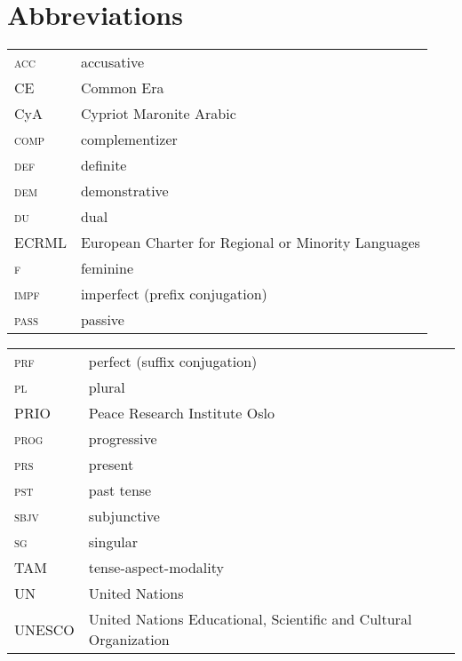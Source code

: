 \documentclass[output=paper]{langsci/langscibook}
\begin{document}
\section*{Abbreviations}
\begin{tabularx}{.5\textwidth}{@{}lQ@{}}
\textsc{acc} & accusative\\
CE & Common Era\\
CyA & Cypriot Maronite Arabic\\
\textsc{comp} & complementizer\\
\textsc{def} & definite\\
\textsc{dem} & demonstrative\\
\textsc{du} & dual\\
ECRML & European Charter for Regional or Minority Languages\\
\textsc{f} & feminine\\
\textsc{impf} & imperfect (prefix conjugation)\\
\textsc{pass} & passive\\
\end{tabularx}%
\begin{tabularx}{.5\textwidth}{@{}lQ@{}}
\textsc{prf} & perfect (suffix conjugation)\\
\textsc{pl} & plural\\
PRIO & Peace Research Institute Oslo\\
\textsc{prog} & progressive \\
\textsc{prs} & present\\
\textsc{pst} & past tense\\
\textsc{sbjv} & subjunctive\\
\textsc{sg} & singular\\
TAM & tense-aspect-modality\\
UN & United Nations\\
UNESCO & United Nations Educational, Scientific and Cultural Organization
\end{tabularx}%


{\sloppy\printbibliography[heading=subbibliography,notkeyword=this]}
\end{document}
